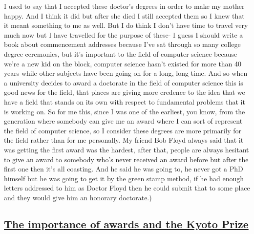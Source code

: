 \documentclass[]{article}
\begin{document}
I used to say that I accepted these doctor's degrees in order to make my
mother happy. And I think it did but after she died I still accepted
them so I knew that it meant something to me as well. But I do think I
don't have time to travel very much now but I have travelled for the
purpose of these- I guess I should write a book about commencement
addresses because I've sat through so many college degree ceremonies,
but it's important to the field of computer science because we're a new
kid on the block, computer science hasn't existed for more than 40 years
while other subjects have been going on for a long, long time. And so
when a university decides to award a doctorate in the field of computer
science this is good news for the field, that places are giving more
credence to the idea that we have a field that stands on its own with
respect to fundamental problems that it is working on. So for me this,
since I was one of the earliest, you know, from the generation where
somebody can give me an award where I can sort of represent the field of
computer science, so I consider these degrees are more primarily for the
field rather than for me personally. My friend Bob Floyd always said
that it was getting the first award was the hardest, after that, people
are always hesitant to give an award to somebody who's never received an
award before but after the first one then it's all coasting. And he said
he was going to, he never got a PhD himself but he was going to get it
by the green stamp method, if he had enough letters addressed to him as
Doctor Floyd then he could submit that to some place and they would give
him an honorary doctorate.)

\subsection{\texorpdfstring{\href{http://webofstories.com/play/17146}{The
importance of awards and the Kyoto
Prize}}{The importance of awards and the Kyoto Prize}}\label{the-importance-of-awards-and-the-kyoto-prize}
\end{document}

